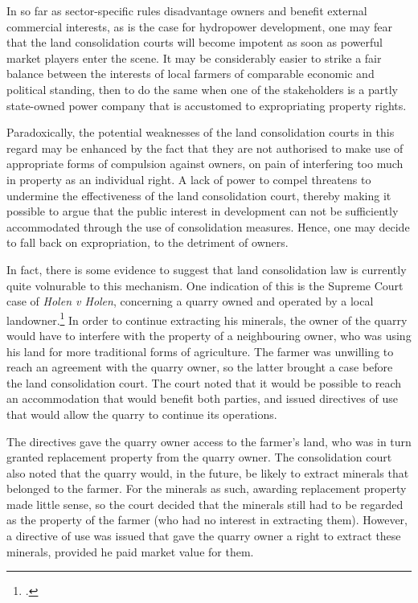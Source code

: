 In so far as sector-specific rules disadvantage owners and benefit external commercial interests, as is the case for hydropower development, one may fear that the land consolidation courts will become impotent as soon as powerful market players enter the scene. It may be considerably easier to strike a fair balance between the interests of local farmers of comparable economic and political standing, then to do the same when one of the stakeholders is a partly state-owned power company that is accustomed to expropriating property rights.

Paradoxically, the potential weaknesses of the land consolidation courts in this regard may be enhanced by the fact that they are not authorised to make use of appropriate forms of compulsion against owners, on pain of interfering too much in property as an individual right. A lack of power to compel threatens to undermine the effectiveness of the land consolidation court, thereby making it possible to argue that the public interest in development can not be sufficiently accommodated through the use of consolidation measures. Hence, one may decide to fall back on expropriation, to the detriment of owners.

In fact, there is some evidence to suggest that land consolidation law is currently quite volnurable  to this mechanism. One indication of this is the Supreme Court case of 
{\it Holen v Holen}, concerning a quarry owned and operated by a local landowner.\footcite{holen95} In order to continue extracting his minerals, the owner of the quarry would have to interfere with the property of a neighbouring owner, who was using his land for more traditional forms of agriculture. The farmer was unwilling to reach an agreement with the quarry owner, so the latter brought a case before the land consolidation court. The court noted that it would be possible to reach an accommodation that would benefit both parties, and issued directives of use that would allow the quarry to continue its operations.

The directives gave the quarry owner access to the farmer's land, who was in turn granted replacement property from the quarry owner. The consolidation court also noted that the quarry would, in the future, be likely to extract minerals that belonged to the farmer. For the minerals as such, awarding replacement property made little sense, so the court decided that the minerals still had to be regarded as the property of the farmer (who had no interest in extracting them). However, a directive of use was issued that gave the quarry owner a right to extract these minerals, provided he paid market value for them. 

